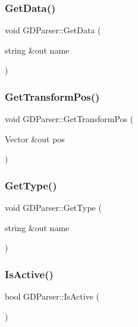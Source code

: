 \hypertarget{class_g_d_parser_a55198dc59e266874da7dae2652c16c96}{}\label{class_g_d_parser_a55198dc59e266874da7dae2652c16c96} 
\subsubsection{\texorpdfstring{Get\+Data()}{GetData()}}
{\footnotesize\ttfamily void G\+D\+Parser\+::\+Get\+Data (\begin{DoxyParamCaption}\item[{string \&out}]{name }\end{DoxyParamCaption})}

\hypertarget{class_g_d_parser_a40bdd548aa0ed41ad69456d3a263f7a0}{}\label{class_g_d_parser_a40bdd548aa0ed41ad69456d3a263f7a0} 
\subsubsection{\texorpdfstring{Get\+Transform\+Pos()}{GetTransformPos()}}
{\footnotesize\ttfamily void G\+D\+Parser\+::\+Get\+Transform\+Pos (\begin{DoxyParamCaption}\item[{Vector \&out}]{pos }\end{DoxyParamCaption})}

\hypertarget{class_g_d_parser_a803f1f05d44c0765bca49b3b9aa2d2d7}{}\label{class_g_d_parser_a803f1f05d44c0765bca49b3b9aa2d2d7} 
\subsubsection{\texorpdfstring{Get\+Type()}{GetType()}}
{\footnotesize\ttfamily void G\+D\+Parser\+::\+Get\+Type (\begin{DoxyParamCaption}\item[{string \&out}]{name }\end{DoxyParamCaption})}

\hypertarget{class_g_d_parser_a191331ce2bab7a6e747bf411a09603ce}{}\label{class_g_d_parser_a191331ce2bab7a6e747bf411a09603ce} 
\subsubsection{\texorpdfstring{Is\+Active()}{IsActive()}}
{\footnotesize\ttfamily bool G\+D\+Parser\+::\+Is\+Active (\begin{DoxyParamCaption}{ }\end{DoxyParamCaption})}

